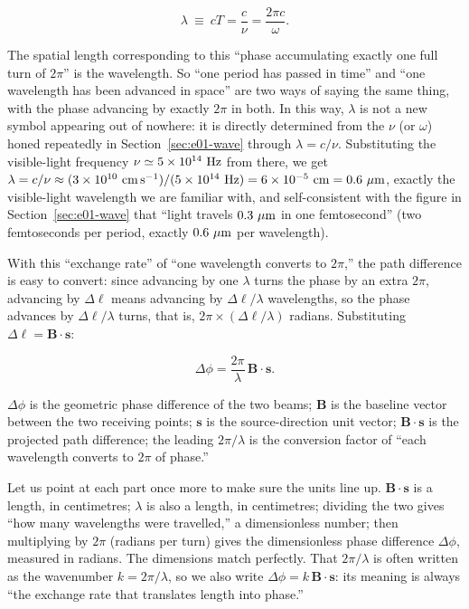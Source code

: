 \[
  \lambda\ \equiv\ cT=\frac{c}{\nu}=\frac{2\pi c}{\omega}.
\]

The spatial length corresponding to this ``phase accumulating exactly one full turn of \(2\pi\)'' is the wavelength. So ``one period has passed in time'' and ``one wavelength has been advanced in space'' are two ways of saying the same thing, with the phase advancing by exactly \(2\pi\) in both. In this way, \(\lambda\) is not a new symbol appearing out of nowhere: it is directly determined from the \(\nu\) (or \(\omega\)) honed repeatedly in Section~\ref{sec:e01-wave} through \(\lambda=c/\nu\). Substituting the visible-light frequency \(\nu\simeq5\times10^{14}\ {\rm Hz}\) from there, we get \(\lambda=c/\nu\approx(3\times10^{10}\ {\rm cm\,s^{-1}})/(5\times10^{14}\ {\rm Hz})=6\times10^{-5}\ {\rm cm}=0.6\ \mu{\rm m}\), exactly the visible-light wavelength we are familiar with, and self-consistent with the figure in Section~\ref{sec:e01-wave} that ``light travels \(0.3\ \mu{\rm m}\) in one femtosecond'' (two femtoseconds per period, exactly \(0.6\ \mu{\rm m}\) per wavelength).

With this ``exchange rate'' of ``one wavelength converts to \(2\pi\),'' the path difference is easy to convert: since advancing by one \(\lambda\) turns the phase by an extra \(2\pi\), advancing by \(\Delta\ell\) means advancing by \(\Delta\ell/\lambda\) wavelengths, so the phase advances by \(\Delta\ell/\lambda\) turns, that is, \(2\pi\times(\Delta\ell/\lambda)\) radians. Substituting \(\Delta\ell=\bm B\cdot\bm s\):

\begin{equation}
  \Delta\phi=\frac{2\pi}{\lambda}\,\bm B\cdot\bm s .
  \label{eq:e01-geometric-phase}
\end{equation}
\begin{formulaexplain}
\(\Delta\phi\) is the geometric phase difference of the two beams; \(\bm B\) is the baseline vector between the two receiving points; \(\bm s\) is the source-direction unit vector; \(\bm B\cdot\bm s\) is the projected path difference; the leading \(2\pi/\lambda\) is the conversion factor of ``each wavelength converts to \(2\pi\) of phase.''
\end{formulaexplain}

Let us point at each part once more to make sure the units line up. \(\bm B\cdot\bm s\) is a length, in centimetres; \(\lambda\) is also a length, in centimetres; dividing the two gives ``how many wavelengths were travelled,'' a dimensionless number; then multiplying by \(2\pi\) (radians per turn) gives the dimensionless phase difference \(\Delta\phi\), measured in radians. The dimensions match perfectly. That \(2\pi/\lambda\) is often written as the wavenumber \(k=2\pi/\lambda\), so we also write \(\Delta\phi=k\,\bm B\cdot\bm s\): its meaning is always ``the exchange rate that translates length into phase.''

